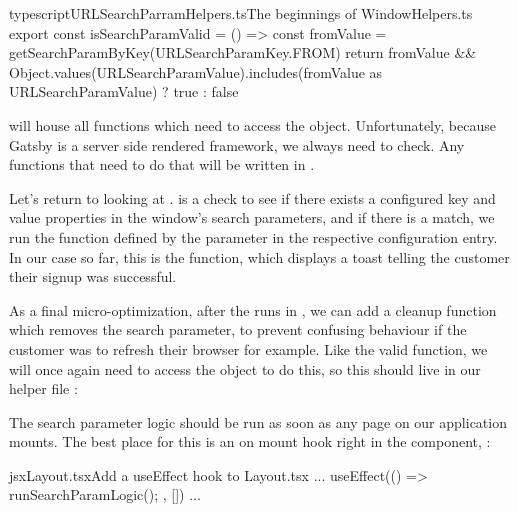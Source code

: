 \documentclass[paper=6in:9in,pagesize=pdftex,headinclude=on,footinclude=on,12pt,twoside]{scrbook}
\begin{document}
\begin{codeInput}{typescript}{URLSearchParramHelpers.ts}{The beginnings of WindowHelpers.ts}
export const isSearchParamValid = () => {
  const fromValue = getSearchParamByKey(URLSearchParamKey.FROM)
  return fromValue && Object.values(URLSearchParamValue).includes(fromValue as URLSearchParamValue) ? true : false
}
\end{codeInput}

 will house all functions which need to access the  object. Unfortunately, because Gatsby is a server side rendered framework, we always need to check. Any functions that need to do that will be written in .

Let's return to looking at .  is a check to see if there exists a configured key and value properties in the window's search parameters, and if there is a match, we run the function defined by the  parameter in the respective configuration entry. In our case so far, this is the  function, which displays a toast telling the customer their signup was successful.


As a final micro-optimization, after the  runs in , we can add a cleanup function which removes the search parameter, to prevent confusing behaviour if the customer was to refresh their browser for example. Like the  valid function, we will once again need to access the  object to do this, so this should live in our helper file :



The search parameter logic should be run as soon as any page on our application mounts. The best place for this is an on mount hook right in the  component, :

\begin{codeInput}{jsx}{Layout.tsx}{Add a useEffect hook to Layout.tsx}
...
useEffect(() => {
  runSearchParamLogic();
}, [])
...
\end{codeInput}
\end{document}
